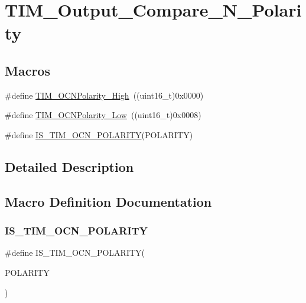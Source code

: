 \hypertarget{group___t_i_m___output___compare___n___polarity}{}\section{T\+I\+M\+\_\+\+Output\+\_\+\+Compare\+\_\+\+N\+\_\+\+Polarity}
\label{group___t_i_m___output___compare___n___polarity}
\subsection*{Macros}
\begin{DoxyCompactItemize}
\item 
\#define \mbox{\hyperlink{group___t_i_m___output___compare___n___polarity_gaa62288888d4f6858bee6b3cd9086ae3f}{T\+I\+M\+\_\+\+O\+C\+N\+Polarity\+\_\+\+High}}~((uint16\+\_\+t)0x0000)
\item 
\#define \mbox{\hyperlink{group___t_i_m___output___compare___n___polarity_ga9582560b2e7dae2e8dc3b65909b0c9cf}{T\+I\+M\+\_\+\+O\+C\+N\+Polarity\+\_\+\+Low}}~((uint16\+\_\+t)0x0008)
\item 
\#define \mbox{\hyperlink{group___t_i_m___output___compare___n___polarity_gad7385dee1d2b6ce0daf23ceaac4439cd}{I\+S\+\_\+\+T\+I\+M\+\_\+\+O\+C\+N\+\_\+\+P\+O\+L\+A\+R\+I\+TY}}(P\+O\+L\+A\+R\+I\+TY)
\end{DoxyCompactItemize}


\subsection{Detailed Description}


\subsection{Macro Definition Documentation}
\mbox{\label{group___t_i_m___output___compare___n___polarity_gad7385dee1d2b6ce0daf23ceaac4439cd}} 
\subsubsection{\texorpdfstring{IS\_TIM\_OCN\_POLARITY}{IS\_TIM\_OCN\_POLARITY}}
{\footnotesize\ttfamily \#define I\+S\+\_\+\+T\+I\+M\+\_\+\+O\+C\+N\+\_\+\+P\+O\+L\+A\+R\+I\+TY(\begin{DoxyParamCaption}\item[{}]{P\+O\+L\+A\+R\+I\+TY }\end{DoxyParamCaption})}

